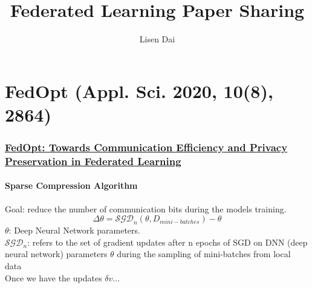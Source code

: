 \documentclass{beamer}
\title{
    Federated Learning Paper Sharing 
}
\author{
    Lisen Dai
}
\begin{document}
    \maketitle

    \section*{
        FedOpt (Appl. Sci. 2020, 10(8), 2864)
    }
    \begin{frame}
        \frametitle{
            \href{https://www.mdpi.com/2076-3417/10/8/2864}{
            FedOpt: Towards Communication Efficiency and Privacy Preservation in Federated Learning
            }
        }
        \framesubtitle{Sparse Compression Algorithm}
        Goal: reduce the number of communication bits during the models training. \\
        $$
        \Delta\theta = \mathcal{SGD}_n (\theta, D_{mini-batches}) - \theta
        $$
        $\theta$: Deep Neural Network parameters. \\
        $\mathcal{SGD}_n$: refers to the set of gradient updates after n epochs of SGD on DNN (deep neural network) parameters $\theta$ during the sampling of mini-batches from local data \\
        
        Once we have the updates $\delta v$... \\
        
    
    \end{frame}
\end{document}
